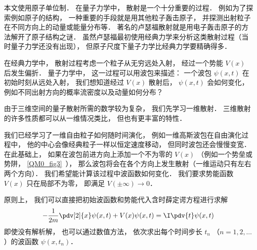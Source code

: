 
\begin{issues}
\issueTODO
\end{issues}


本文使用原子单位制． 在量子力学中， 散射是一个十分重要的过程． 例如为了探索例如原子的结构， 一种重要的手段就是用其他粒子轰击原子， 并探测出射粒子在不同方向上的动量或能量分布等． 著名的卢瑟福散射就是用电子轰击原子的方法解开了原子结构之谜． 虽然卢瑟福最初使用经典力学来分析这类散射过程（当时量子力学还没有出现）， 但原子尺度下量子力学比经典力学要精确得多．

在经典力学中， 散射过程考虑一个粒子从无穷远处入射， 经过一个势能 $V(x)$ 后发生偏折． 量子力学中， 这一过程可以用波包来描述： 一个波包 $\psi(x, t)$ 在初始时刻从远处入射， 我们想知道经过 $V(x)$ 散射后， $\psi(x, t)$ 会如何变化， 例如不同出射方向的概率流密度以及动量如何分布？

由于三维空间的量子散射所需的数学较为复杂， 我们先学习一维散射． 三维散射的许多性质都可以从一维情况类比， 但也有更丰富的特性．

我们已经学习了一维自由粒子如何随时间演化， 例如一维高斯波包在自由演化过程中， 他的中心会像经典粒子一样以恒定速度移动， 但同时波包还会慢慢变宽． 在此基础上， 如果在波包前进方向上添加一个不为零的 $V(x)$ （例如一个势垒或势阱， \autoref{QM0_fig3}~）， 那么波包将会在各个方向上发生散射（一维运动只有左右两个方向）． 我们希望能计算该过程中波函数如何变化． 我们要求势能函数 $V(x)$ 只在局部不为零， 即满足 $V(\pm\infty) \to 0$． 

原则上， 我们可以直接把初始波函数和势能代入含时薛定谔方程进行求解
\begin{equation}\label{Sca1D_eq1}
-\frac{1}{2m}\pdv[2]{x}\psi(x, t) + V(x) \psi(x, t) = \I \pdv{t} \psi(x, t)
\end{equation}
即使没有解析解， 也可以通过数值方法， 依次求出每个时间步长 $t_n$ （$n = 1, 2, \dots$）的波函数 $\psi(x, t_n)$．


